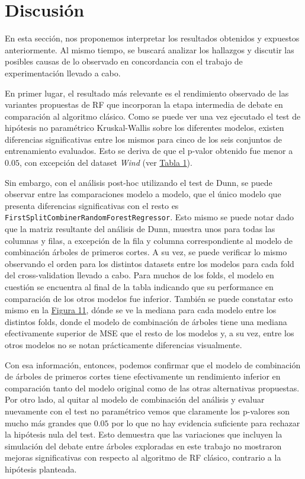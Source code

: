 %
\chapter{Discusión}
\label{ch::capitulo8}

En esta sección, nos proponemos interpretar los resultados obtenidos y expuestos anteriormente. Al mismo tiempo, se buscará analizar los hallazgos y discutir las posibles causas de lo observado en concordancia con el trabajo de experimentación llevado a cabo.

En primer lugar, el resultado más relevante es el rendimiento observado de las variantes propuestas de RF que incorporan la etapa intermedia de debate en comparación al algoritmo clásico. Como se puede ver una vez ejecutado el test de hipótesis no paramétrico Kruskal-Wallis sobre los diferentes modelos, existen diferencias significativas entre los mismos para cinco de los seis conjuntos de entrenamiento evaluados. Esto se deriva de que el p-valor obtenido fue menor a $0.05$, con excepción del dataset \textit{Wind} (ver \hyperref[tab1]{Tabla 1}).

Sin embargo, con el análisis post-hoc utilizando el test de Dunn, se puede observar entre las comparaciones modelo a modelo, que el único modelo que presenta diferencias significativas con el resto es \texttt{FirstSplitCombinerRandomForestRegressor}. Esto mismo se puede notar dado que la matriz resultante del análisis de Dunn, muestra unos para todas las columnas y filas, a excepción de la fila y columna correspondiente al modelo de combinación árboles de primeros cortes. A su vez, se puede verificar lo mismo observando el orden para los distintos datasets entre los modelos para cada fold del cross-validation llevado a cabo. Para muchos de los folds, el modelo en cuestión se encuentra al final de la tabla indicando que su performance en comparación de los otros modelos fue inferior. También se puede constatar esto mismo en la \hyperref[figure11]{Figura 11}, dónde se ve la mediana para cada modelo entre los distintos folds, donde el modelo de combinación de árboles tiene una mediana efectivamente superior de MSE que el resto de los modelos y, a su vez, entre los otros modelos no se notan prácticamente diferencias visualmente.

Con esa información, entonces, podemos confirmar que el modelo de combinación de árboles de primeros cortes tiene efectivamente un rendimiento inferior en comparación tanto del modelo original como de las otras alternativas propuestas. Por otro lado, al quitar al modelo de combinación del análisis y evaluar nuevamente con el test no paramétrico vemos que claramente los p-valores son mucho más grandes que $0.05$ por lo que no hay evidencia suficiente para rechazar la hipótesis nula del test. Esto demuestra que las variaciones que incluyen la simulación del debate entre árboles exploradas en este trabajo no mostraron mejoras significativas con respecto al algoritmo de RF clásico, contrario a la hipótesis planteada.

